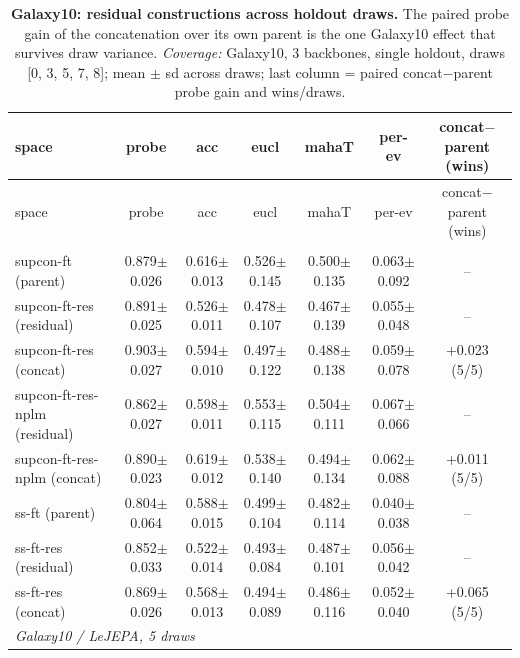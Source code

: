 \begin{landscape}
\begin{center}
\footnotesize
\setlength{\tabcolsep}{3pt}
\begin{longtable}{lcccccc}
\caption{\textbf{Galaxy10: residual constructions across holdout draws.} The paired probe gain of the concatenation over its own parent is the one Galaxy10 effect that survives draw variance. \emph{Coverage:} Galaxy10, 3 backbones, single holdout, draws [0, 3, 5, 7, 8]; mean $\pm$ sd across draws; last column = paired concat$-$parent probe gain and wins/draws.}\label{tab:app_galaxy10_residual_draws}\\
\toprule
space & probe & acc & eucl & mahaT & per-ev & concat$-$parent (wins) \\
\midrule
\endfirsthead
\toprule
space & probe & acc & eucl & mahaT & per-ev & concat$-$parent (wins) \\
\midrule
\endhead
\bottomrule
\endfoot
\multicolumn{7}{l}{\emph{Galaxy10 / DINO, 5 draws}} \\
\quad supcon-ft (parent) & 0.879$\pm$0.026 & 0.616$\pm$0.013 & 0.526$\pm$0.145 & 0.500$\pm$0.135 & 0.063$\pm$0.092 & -- \\
\quad supcon-ft-res (residual) & 0.891$\pm$0.025 & 0.526$\pm$0.011 & 0.478$\pm$0.107 & 0.467$\pm$0.139 & 0.055$\pm$0.048 & -- \\
\quad supcon-ft-res (concat) & 0.903$\pm$0.027 & 0.594$\pm$0.010 & 0.497$\pm$0.122 & 0.488$\pm$0.138 & 0.059$\pm$0.078 & +0.023 (5/5) \\
\quad supcon-ft-res-nplm (residual) & 0.862$\pm$0.027 & 0.598$\pm$0.011 & 0.553$\pm$0.115 & 0.504$\pm$0.111 & 0.067$\pm$0.066 & -- \\
\quad supcon-ft-res-nplm (concat) & 0.890$\pm$0.023 & 0.619$\pm$0.012 & 0.538$\pm$0.140 & 0.494$\pm$0.134 & 0.062$\pm$0.088 & +0.011 (5/5) \\
\quad ss-ft (parent) & 0.804$\pm$0.064 & 0.588$\pm$0.015 & 0.499$\pm$0.104 & 0.482$\pm$0.114 & 0.040$\pm$0.038 & -- \\
\quad ss-ft-res (residual) & 0.852$\pm$0.033 & 0.522$\pm$0.014 & 0.493$\pm$0.084 & 0.487$\pm$0.101 & 0.056$\pm$0.042 & -- \\
\quad ss-ft-res (concat) & 0.869$\pm$0.026 & 0.568$\pm$0.013 & 0.494$\pm$0.089 & 0.486$\pm$0.116 & 0.052$\pm$0.040 & +0.065 (5/5) \\
\multicolumn{7}{l}{\emph{Galaxy10 / LeJEPA, 5 draws}} \\

\end{longtable}
\end{center}
\end{landscape}
